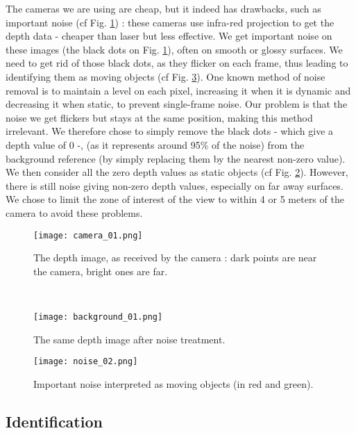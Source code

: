 \documentclass[smallextended]{svjour3}
\begin{document}
The cameras we are using are cheap, but it indeed has drawbacks, such as important noise (cf Fig. \ref{fig:camera1}) : these cameras use infra-red projection to get the depth data - cheaper than laser but less effective. We get important noise on these images (the black dots on Fig. \ref{fig:camera1}), often on smooth or glossy surfaces.
We need to get rid of those black dots, as they flicker on each frame, thus leading to identifying them as moving objects (cf Fig. \ref{fig:noise}). One known method of noise removal is to maintain a level on each pixel, increasing it when it is dynamic and decreasing it when static, to prevent single-frame noise. Our problem is that the noise we get flickers but stays at the same position, making this method irrelevant.
We therefore chose to simply remove the black dots - which give a depth value of 0 -, (as it represents around 95\% of the noise) from the background reference (by simply replacing them by the nearest non-zero value). We then consider all the zero depth values as static objects (cf Fig. \ref{fig:background1}).
However, there is still noise giving non-zero depth values, especially on far away surfaces. We chose to limit the zone of interest of the view to within 4 or 5 meters of the camera to avoid these problems.

\begin{figure*}[t!]
    \centering
    \begin{subfigure}[t]{0.5\textwidth}
        \centering
        \texttt{[image: camera\_01.png]}
        \caption{\label{fig:camera1}The depth image, as received by the camera : dark points are near the camera, bright ones are far.}
    \end{subfigure}
    ~ 
    \begin{subfigure}[t]{0.5\textwidth}
        \centering
        \texttt{[image: background\_01.png]}
        \caption{\label{fig:background1}The same depth image after noise treatment.}
    \end{subfigure}
    \caption{Noise suppression}
\end{figure*}

\begin{figure}
\centering
\texttt{[image: noise\_02.png]}
\caption{\label{fig:noise}Important noise interpreted as moving objects (in red and green).}
\end{figure}

\subsection{Identification}
\end{document}
